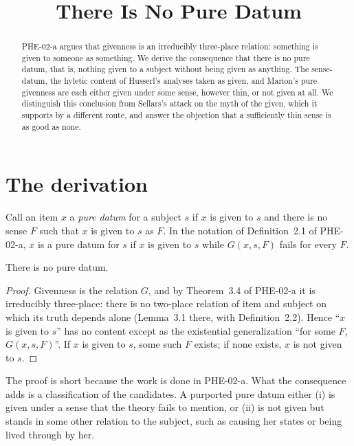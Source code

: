 \documentclass{situationist-preprint}
\title{There Is No Pure Datum}
\begin{document}
\maketitle

\begin{abstract}
PHE-02-a argues that givenness is an irreducibly three-place relation: something is given to someone as something. We derive the consequence that there is no pure datum, that is, nothing given to a subject without being given as anything. The sense-datum, the hyletic content of Husserl's analyses taken as given, and Marion's pure givenness are each either given under some sense, however thin, or not given at all. We distinguish this conclusion from Sellars's attack on the myth of the given, which it supports by a different route, and answer the objection that a sufficiently thin sense is as good as none.
\end{abstract}

\section{The derivation}

Call an item $x$ a \emph{pure datum} for a subject $s$ if $x$ is given to $s$ and there is no sense $F$ such that $x$ is given to $s$ as $F$. In the notation of Definition~2.1 of PHE-02-a, $x$ is a pure datum for $s$ if $x$ is given to $s$ while $G(x,s,F)$ fails for every $F$.

\begin{proposition}\label{p:nopure}
There is no pure datum.
\end{proposition}

\begin{proof}
Givenness is the relation $G$, and by Theorem~3.4 of PHE-02-a it is irreducibly three-place: there is no two-place relation of item and subject on which its truth depends alone (Lemma~3.1 there, with Definition~2.2). Hence \enquote{$x$ is given to $s$} has no content except as the existential generalization \enquote{for some $F$, $G(x,s,F)$}. If $x$ is given to $s$, some such $F$ exists; if none exists, $x$ is not given to $s$.
\end{proof}

The proof is short because the work is done in PHE-02-a. What the consequence adds is a classification of the candidates. A purported pure datum either (i) is given under a sense that the theory fails to mention, or (ii) is not given but stands in some other relation to the subject, such as causing her states or being lived through by her.
\end{document}
